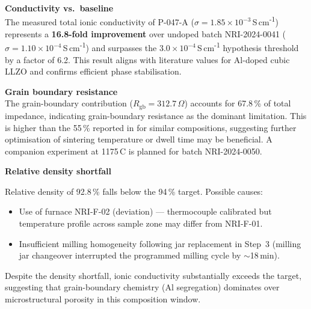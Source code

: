 
\begin{tcolorbox}[notebox, title={\faChartLine\quad Analysis \& Interpretation}]

  \textbf{Conductivity vs.\ baseline}\\[4pt]
  {\small
    The measured total ionic conductivity of P-047-A ($\sigma = 1.85 \times 10^{-3}$\,S\,cm\textsuperscript{-1})
    represents a \textbf{16.8-fold improvement} over undoped batch NRI-2024-0041
    ($\sigma = 1.10 \times 10^{-4}$\,S\,cm\textsuperscript{-1}) and surpasses
    the $3.0 \times 10^{-4}$\,S\,cm\textsuperscript{-1} hypothesis threshold by a factor of 6.2.
    This result aligns with literature values for Al-doped cubic LLZO
    \cite{Geiger2011, Murugan2007} and confirms efficient phase stabilisation.
  }

  \vspace{8pt}
  \textbf{Grain boundary resistance}\\[4pt]
  {\small
    The grain-boundary contribution ($R_{\text{gb}} = 312.7\,\Omega$) accounts for
    67.8\,\% of total impedance, indicating grain-boundary resistance as the dominant
    limitation. This is higher than the 55\,\% reported in \cite{Geiger2011} for
    similar compositions, suggesting further optimisation of sintering temperature or
    dwell time may be beneficial. A companion experiment at 1175\,\textdegree C is
    planned for batch NRI-2024-0050.
  }

  \vspace{8pt}
  \textbf{Relative density shortfall}\\[4pt]
  {\small
    Relative density of 92.8\,\% falls below the 94\,\% target. Possible causes:
    \begin{itemize}[leftmargin=16pt, itemsep=2pt, topsep=2pt]
      \item Use of furnace NRI-F-02 (deviation) — thermocouple calibrated but
            temperature profile across sample zone may differ from NRI-F-01.
      \item Insufficient milling homogeneity following jar replacement in Step~3
            (milling jar changeover interrupted the programmed milling cycle by
            $\sim$18\,min).
    \end{itemize}
    Despite the density shortfall, ionic conductivity substantially exceeds the
    target, suggesting that grain-boundary chemistry (Al segregation) dominates
    over microstructural porosity in this composition window.
  }


\end{tcolorbox}
